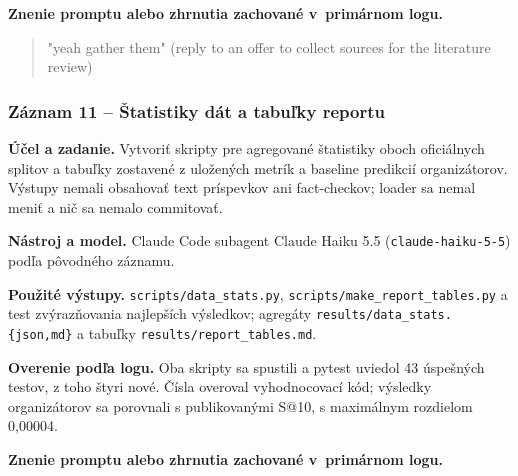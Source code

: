 \par\noindent\textbf{Znenie promptu alebo zhrnutia zachované v~primárnom logu.}

\begin{quote}\normalsize "yeah gather them" (reply to an offer to collect sources for the literature review)\end{quote}

\subsubsection*{Záznam 11 -- Štatistiky dát a tabuľky reportu}


\par\noindent \textbf{Účel a zadanie.} Vytvoriť skripty pre agregované štatistiky oboch oficiálnych splitov a tabuľky zostavené z uložených metrík a baseline predikcií organizátorov. Výstupy nemali obsahovať text príspevkov ani fact-checkov; loader sa nemal meniť a nič sa nemalo commitovať.\par\smallskip
\par\noindent \textbf{Nástroj a model.} Claude Code subagent Claude Haiku 5.5 (\texttt{claude-\allowbreak{}haiku-\allowbreak{}5-\allowbreak{}5}) podľa pôvodného záznamu.\par\smallskip
\par\noindent \textbf{Použité výstupy.} \texttt{scripts/\allowbreak{}data\_\allowbreak{}stats.\allowbreak{}py}, \texttt{scripts/\allowbreak{}make\_\allowbreak{}report\_\allowbreak{}tables.\allowbreak{}py} a test zvýrazňovania najlepších výsledkov; agregáty \texttt{results/\allowbreak{}data\_\allowbreak{}stats.\allowbreak{}\{json,\allowbreak{}md\}} a tabuľky \texttt{results/\allowbreak{}report\_\allowbreak{}tables.\allowbreak{}md}.\par\smallskip
\par\noindent \textbf{Overenie podľa logu.} Oba skripty sa spustili a pytest uviedol 43 úspešných testov, z toho štyri nové. Čísla overoval vyhodnocovací kód; výsledky organizátorov sa porovnali s publikovanými S@10, s maximálnym rozdielom 0,00004.\par\smallskip

\par\noindent\textbf{Znenie promptu alebo zhrnutia zachované v~primárnom logu.}

